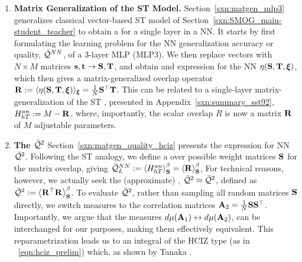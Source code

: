 

\begin{enumerate}[label=5.\arabic*]
\item
\textbf{Matrix Generalization of the ST Model.}
Section~\ref{sxn:matgen_mlp3} generalizes
classical \STATMECH vector-based ST model of Section~\ref{sxn:SMOG_main-student_teacher}
to obtain a \LayerQuality for a single layer in a NN.
It starts by first formulating the learning problem for
the  NN generalization accuracy or quality, $\bar{\mathcal{Q}}^{NN}$,
of a  3-layer MLP (MLP3).
We then replace vectors with $N \times M$ matrices ${\mathbf{s}},{\mathbf{t}}\rightarrow{\mathbf{S}},{\mathbf{T}}$,
and obtain and expression for the NN \SelfOverlap $\eta({\mathbf{S}},{\mathbf{T}},\boldsymbol{\xi})$,
which then gives a matrix-generalized overlap operator
$\mathbf{R}:=\langle\eta({\mathbf{S}},{\mathbf{T}},\boldsymbol{\xi})\rangle_{\boldsymbol{\xi}}=\tfrac{1}{N}{\mathbf{S}}^{\top}{\mathbf{T}}$.
This can be related to a single-layer matrix-generalization of the ST \AnnealedHamiltonian, 
presented in Appendix~\ref{sxn:summary_sst92}, $H^{an}_{hT}:=M-\mathbf{R}$,
where, importantly, the scalar overlap $R$ is now a matrix $\mathbf{R}$ of $M$ adjustable parameters.

\item
\textbf{The \LayerQualitySquared $\bar{\mathcal{Q}}^{2}$}
Section~\ref{sxn:matgen_quality_hciz} presents the expression for NN \LayerQualitySquared $\bar{\mathcal{Q}}^{2}$.
Following the ST analogy, we define a \ThermalAverage over possible \Student weight matrices ${\mathbf{S}}$
for the matrix overlap, giving $\bar{\mathcal{Q}}^{NN}_{L}:=\left\langle H^{an}_{hT} \right\rangle_{\mathbf S}^{\beta} =\left\langle \mathbf{R} \right\rangle_{\mathbf S}^{\beta}$,
For technical reasons, however, we actually seek the (approximate)  \LayerQualitySquared, $\bar{\mathcal{Q}}^{2}\approx\bar{\mathcal{Q}}^{2}$,
defined as $\bar{\mathcal{Q}}^{2}:=\left\langle {\mathbf{R}}^{\top}\mathbf{R} \right\rangle_{\mathbf S}^{\beta}$.
To evaluate $\bar{\mathcal{Q}}^{2}$, rather than sampling all random \Student matrices ${\mathbf{S}}$ directly,
we switch measures to the \Student correlation matrices 
$\mathbf{A}_{2} = \tfrac{1}{N}{\mathbf{S}}{\mathbf{S}}^{\top}$.
Importantly, we argue that the measures $d\mu(\mathbf{A}_{1})\leftrightarrow d\mu(\mathbf{A}_{2})$,
can be interchanged for our purposes, making them effectively equivalent.
This reparametrization leads us to an integral of the HCIZ type (as in \EQN~\ref{eqn:hciz_prelim})
which, as shown by Tanaka \cite{Tanaka2007, Tanaka2008}.


\end{enumerate}
